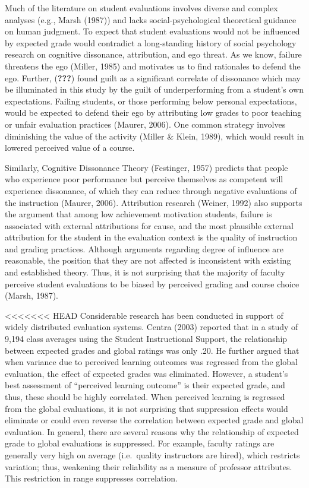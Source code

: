 \documentclass[,man]{apa6}
\theoremstyle{definition}
\theoremstyle{definition}
\theoremstyle{definition}
\theoremstyle{remark}
\begin{document}
Much of the literature on student evaluations involves diverse and
complex analyses (e.g., Marsh (1987)) and lacks social-psychological
theoretical guidance on human judgment. To expect that student
evaluations would not be influenced by expected grade would contradict a
long-standing history of social psychology research on cognitive
dissonance, attribution, and ego threat. As we know, failure threatens
the ego (Miller, 1985) and motivates us to find rationales to defend the
ego. Further, ({\textbf{???}}) found guilt as a significant correlate of
dissonance which may be illuminated in this study by the guilt of
underperforming from a student's own expectations. Failing students, or
those performing below personal expectations, would be expected to
defend their ego by attributing low grades to poor teaching or unfair
evaluation practices (Maurer, 2006). One common strategy involves
diminishing the value of the activity (Miller \& Klein, 1989), which
would result in lowered perceived value of a course.

Similarly, Cognitive Dissonance Theory (Festinger, 1957) predicts that
people who experience poor performance but perceive themselves as
competent will experience dissonance, of which they can reduce through
negative evaluations of the instruction (Maurer, 2006). Attribution
research (Weiner, 1992) also supports the argument that among low
achievement motivation students, failure is associated with external
attributions for cause, and the most plausible external attribution for
the student in the evaluation context is the quality of instruction and
grading practices. Although arguments regarding degree of influence are
reasonable, the position that they are not affected is inconsistent with
existing and established theory. Thus, it is not surprising that the
majority of faculty perceive student evaluations to be biased by
perceived grading and course choice (Marsh, 1987).

<<<<<<< HEAD
Considerable research has been conducted in support of widely
distributed evaluation systems. Centra (2003) reported that in a study
of 9,194 class averages using the Student Instructional Support, the
relationship between expected grades and global ratings was only .20. He
further argued that when variance due to perceived learning outcomes was
regressed from the global evaluation, the effect of expected grades was
eliminated. However, a student's best assessment of \enquote{perceived
learning outcome} is their expected grade, and thus, these should be
highly correlated. When perceived learning is regressed from the global
evaluations, it is not surprising that suppression effects would
eliminate or could even reverse the correlation between expected grade
and global evaluation. In general, there are several reasons why the
relationship of expected grade to global evaluations is suppressed. For
example, faculty ratings are generally very high on average
(i.e.~quality instructors are hired), which restricts variation; thus,
weakening their reliability as a measure of professor attributes. This
restriction in range suppresses correlation.
\end{document}
